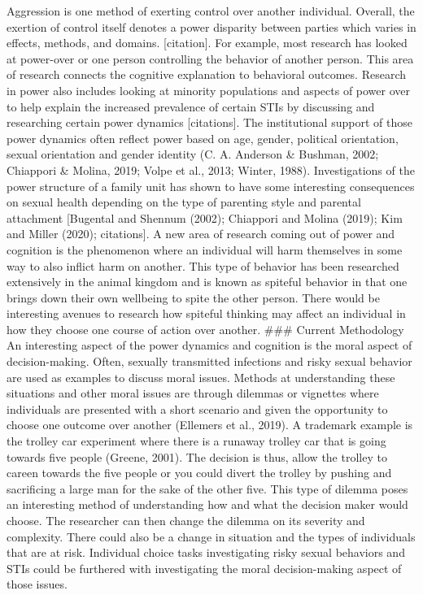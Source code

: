 \documentclass[
  donotrepeattitle,doc, 12pt, a4paper,floatsintext]{apa7}
\begin{document}
Aggression is one method of exerting control over another individual. Overall, the exertion of control itself denotes a power disparity between parties which varies in effects, methods, and domains. {[}citation{]}. For example, most research has looked at power-over or one person controlling the behavior of another person. This area of research connects the cognitive explanation to behavioral outcomes. Research in power also includes looking at minority populations and aspects of power over to help explain the increased prevalence of certain STIs by discussing and researching certain power dynamics {[}citations{]}. The institutional support of those power dynamics often reflect power based on age, gender, political orientation, sexual orientation and gender identity (C. A. Anderson \& Bushman, 2002; Chiappori \& Molina, 2019; Volpe et al., 2013; Winter, 1988). Investigations of the power structure of a family unit has shown to have some interesting consequences on sexual health depending on the type of parenting style and parental attachment {[}Bugental and Shennum (2002); Chiappori and Molina (2019); Kim and Miller (2020); citations{]}. A new area of research coming out of power and cognition is the phenomenon where an individual will harm themselves in some way to also inflict harm on another. This type of behavior has been researched extensively in the animal kingdom and is known as spiteful behavior in that one brings down their own wellbeing to spite the other person. There would be interesting avenues to research how spiteful thinking may affect an individual in how they choose one course of action over another.
\#\#\# Current Methodology
An interesting aspect of the power dynamics and cognition is the moral aspect of decision-making. Often, sexually transmitted infections and risky sexual behavior are used as examples to discuss moral issues. Methods at understanding these situations and other moral issues are through dilemmas or vignettes where individuals are presented with a short scenario and given the opportunity to choose one outcome over another (Ellemers et al., 2019). A trademark example is the trolley car experiment where there is a runaway trolley car that is going towards five people (Greene, 2001). The decision is thus, allow the trolley to careen towards the five people or you could divert the trolley by pushing and sacrificing a large man for the sake of the other five. This type of dilemma poses an interesting method of understanding how and what the decision maker would choose. The researcher can then change the dilemma on its severity and complexity. There could also be a change in situation and the types of individuals that are at risk. Individual choice tasks investigating risky sexual behaviors and STIs could be furthered with investigating the moral decision-making aspect of those issues.
\end{document}
